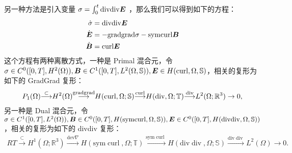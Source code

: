 \documentclass[lang=cn,a4paper,newtx]{elegantpaper}
\begin{document}
另一种方法是引入变量 $\sigma = \int_{0}^t \mathrm{div} \mathrm{div} \boldsymbol{E}$
，那么我们可以得到如下的方程：
\begin{equation}
    \label{lineareb2}
    \begin{aligned}
        \dot{\sigma} & = \mathrm{div} \mathrm{div} \boldsymbol{E}\\
        \dot{\boldsymbol{E}} &= - \mathrm{grad}\mathrm{grad}{\sigma} - \mathrm{sym}\mathrm{curl} \boldsymbol{B}\\
        \dot{\boldsymbol{B}} & = \mathrm{curl} \boldsymbol{E}
    \end{aligned}
\end{equation}
这个方程有两种离散方式，一种是 Primal 混合元，令 
$\sigma \in C^0([0, T], H^2(\Omega)), 
\boldsymbol{B} \in C^1([0, T], L^2(\Omega, \mathbb{S})), \boldsymbol{E} \in H(\mathrm{curl},
\Omega, \mathbb{S})$，相关的复形为如下的 GradGrad 复形：
\begin{equation}
\label{gradgradcomplex}
\begin{aligned}
P_1(\Omega)\overset{\subset}{\operatorname*{\longrightarrow}}H^2(\Omega)\overset{\mathrm{grad}\mathrm{grad}}{\operatorname*{\longrightarrow}}H(\mathrm{curl},\Omega;\mathbb{S})\overset{\mathrm{curl}}{\operatorname*{\longrightarrow}}H(\mathrm{div},\Omega;\mathbb{T})\overset{\mathrm{div}}{\operatorname*{\longrightarrow}}L^2(\Omega;\mathbb{R}^3)\to0,
\end{aligned}
\end{equation}
另一种是 Dual 混合元，令 $\sigma \in C^1([0, T], L^2(\Omega)), \boldsymbol{B} \in 
C^0([0, T], H(\mathrm{sym}\mathrm{curl}, \Omega, \mathbb{S})), \boldsymbol{E} \in C^0([0, T],
H(\mathrm{div}\mathrm{div}, \Omega, \mathbb{S}))$，相关的复形为如下的 divdiv 复形：
\begin{equation}
    \label{divdivcomplex}
\begin{aligned}
    RT\overset{\subset}{\operatorname*{\longrightarrow}}H^1(\Omega;\mathbb{R}^3)\overset{\mathrm{dev}\nabla}{\operatorname*{\longrightarrow}}H(\mathrm{sym}\operatorname{curl},\Omega;\mathbb{T})\overset{\mathrm{sym}\operatorname{curl}}{\operatorname*{\longrightarrow}}H(\mathrm{div}\operatorname{div},\Omega;\mathbb{S})\overset{\mathrm{div}\operatorname{div}}{\operatorname*{\longrightarrow}}L^2(\Omega)\to0.
\end{aligned}
\end{equation}
\end{document}
